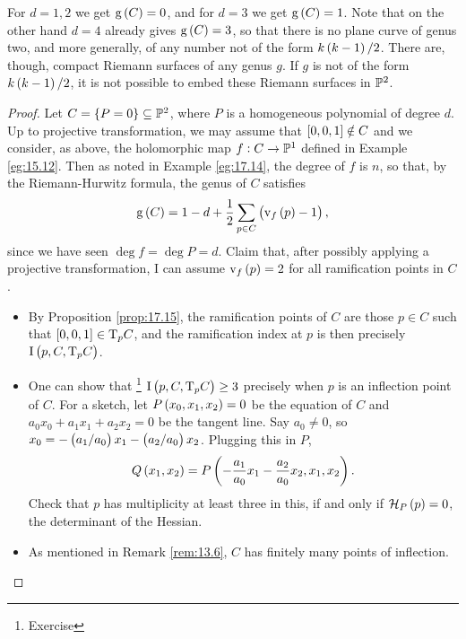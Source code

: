 \begin{remark}
For $ d = 1, 2 $ we get $ \g\br{C} = 0 $, and for $ d = 3 $ we get $ \g\br{C} = 1 $. Note that on the other hand $ d = 4 $ already gives $ \g\br{C} = 3 $, so that there is no plane curve of genus two, and more generally, of any number not of the form $ k\br{k - 1} / 2 $. There are, though, compact Riemann surfaces of any genus $ g $. If $ g $ is not of the form $ k\br{k - 1} / 2 $, it is not possible to embed these Riemann surfaces in $ \mathbb{P}^2 $.
\end{remark}


\begin{proof}
Let $ C = \cbr{P = 0} \subseteq \PP^2 $, where $ P $ is a homogeneous polynomial of degree $ d $. Up to projective transformation, we may assume that $ \sbr{0, 0, 1} \notin C $ and we consider, as above, the holomorphic map $ f : C \to \mathbb{P}^1 $ defined in Example \ref{eg:15.12}. Then as noted in Example \ref{eg:17.14}, the degree of $ f $ is $ n $, so that, by the Riemann-Hurwitz formula, the genus of $ C $ satisfies
$$ \g\br{C} = 1 - d + \dfrac{1}{2}\sum_{p \in C} \br{\v_f\br{p} - 1}, $$
since we have seen $ \deg f = \deg P = d $. Claim that, after possibly applying a projective transformation, I can assume $ \v_f\br{p} = 2 $ for all ramification points in $ C $.
\begin{itemize}
\item By Proposition \ref{prop:17.15}, the ramification points of $ C $ are those $ p \in C $ such that $ \sbr{0, 0, 1} \in \T_p C $, and the ramification index at $ p $ is then precisely $ \I\br{p, C, \T_p C} $.
\item One can show that \footnote{Exercise} $ \I\br{p, C, \T_p C} \ge 3 $ precisely when $ p $ is an inflection point of $ C $. For a sketch, let $ P\br{x_0, x_1, x_2} = 0 $ be the equation of $ C $ and $ a_0x_0 + a_1x_1 + a_2x_2 = 0 $ be the tangent line. Say $ a_0 \ne 0 $, so $ x_0 = -\br{a_1 / a_0}x_1 - \br{a_2 / a_0}x_2 $. Plugging this in $ P $,
$$ Q\br{x_1, x_2} = P\br{-\dfrac{a_1}{a_0}x_1 - \dfrac{a_2}{a_0}x_2, x_1, x_2}. $$
Check that $ p $ has multiplicity at least three in this, if and only if $ \HHH_P\br{p} = 0 $, the determinant of the Hessian.
\item As mentioned in Remark \ref{rem:13.6}, $ C $ has finitely many points of inflection.
\end{itemize}

\pagebreak


\end{proof}
